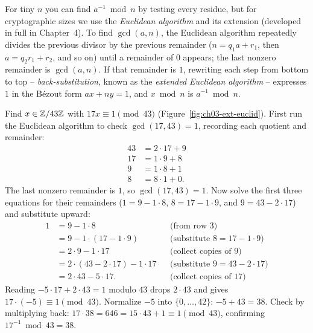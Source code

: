 For tiny $n$ you can find $a^{-1} \bmod n$ by testing every residue, but for cryptographic sizes we use the \emph{Euclidean algorithm} and its extension (developed in full in Chapter~4). To find $\gcd(a, n)$, the Euclidean algorithm repeatedly divides the previous divisor by the previous remainder ($n = q_1 a + r_1$, then $a = q_2 r_1 + r_2$, and so on) until a remainder of $0$ appears; the last nonzero remainder is $\gcd(a, n)$. If that remainder is $1$, rewriting each step from bottom to top -- \emph{back-substitution}, known as the \emph{extended Euclidean algorithm} -- expresses $1$ in the B\'ezout form $ax + ny = 1$, and $x \bmod n$ is $a^{-1} \bmod n$.

\begin{example}
\label{ch03:inv-17-43}
Find $x \in \mathbb{Z}/43\mathbb{Z}$ with $17x \equiv 1 \pmod{43}$ (Figure~\ref{fig:ch03-ext-euclid}). First run the Euclidean algorithm to check $\gcd(17,43)=1$, recording each quotient and remainder:
\begin{align*}
  43 &= 2\cdot 17 + 9 \\
  17 &= 1\cdot 9 + 8 \\
   9 &= 1\cdot 8 + 1 \\
   8 &= 8\cdot 1 + 0.
\end{align*}
The last nonzero remainder is $1$, so $\gcd(17,43) = 1$. Now solve the first three equations for their remainders ($1 = 9 - 1\cdot 8$, $8 = 17 - 1\cdot 9$, and $9 = 43 - 2\cdot 17$) and substitute upward:
\begin{align*}
  1 &= 9 - 1\cdot 8 && \text{(from row 3)} \\
    &= 9 - 1\cdot(17 - 1\cdot 9) && \text{(substitute $8 = 17 - 1\cdot 9$)} \\
    &= 2\cdot 9 - 1\cdot 17 && \text{(collect copies of $9$)} \\
    &= 2\cdot(43 - 2\cdot 17) - 1\cdot 17 && \text{(substitute $9 = 43 - 2\cdot 17$)} \\
    &= 2\cdot 43 - 5\cdot 17. && \text{(collect copies of $17$)}
\end{align*}
Reading $-5 \cdot 17 + 2\cdot 43 = 1$ modulo $43$ drops $2\cdot 43$ and gives $17 \cdot (-5) \equiv 1 \pmod{43}$. Normalize $-5$ into $\{0,\dots,42\}$: $-5 + 43 = 38$. Check by multiplying back: $17 \cdot 38 = 646 = 15\cdot 43 + 1 \equiv 1 \pmod{43}$, confirming $17^{-1} \bmod 43 = 38$.
\end{example}

